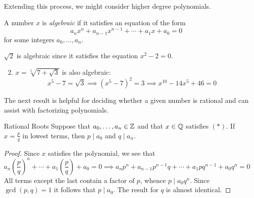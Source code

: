 % 


Extending this process, we might consider higher degree polynomials.

\begin{defn}{}{}
	A number $x$ is \emph{algebraic} if it satisfies an equation of the form\footnotemark
	\[a_nx^n+a_{n-1}x^{n-1}+\cdots+a_1x+a_0=0\tag*{$(\ast)$}\]
	for some integers $a_0,\ldots,a_n$.
\end{defn}


\begin{examples}{}{}
	\exstart $\sqrt 2$ is algebraic since it satisfies the equation $x^2-2=0$.

	\begin{enumerate}\setcounter{enumi}{1}
	  \item $x=\sqrt[5]{7+\sqrt 3}$ is also algebraic:
	  \[x^5-7=\sqrt 3\implies (x^5-7)^2=3\implies x^{10}-14x^5+46=0\]
	\end{enumerate}
\end{examples}


The next result is helpful for deciding whether a given number is rational and can assist with factorizing polynomials.

\begin{thm}{Rational Roots}{}
	Suppose that $a_0,\ldots,a_n\in\mathbb{Z}$ and that $x\in\mathbb{Q}$ satisfies $(\ast)$. If $x=\frac pq$ in lowest terms, then $p\mid a_0$ and $q\mid a_n$.
\end{thm}

\begin{proof}
	Since $x$ satisfies the polynomial, we see that
	\[a_n\left(\frac pq\right)^n+\cdots+a_1\left(\frac pq\right)+a_0=0\implies a_np^n+a_{n-1}p^{n-1}q+\cdots+a_1pq^{n-1}+a_0q^n=0\]
	All terms except the last contain a factor of $p$, whence $p\mid a_0q^n$. Since $\gcd(p,q)=1$ it follows that $p\mid a_0$. The result for $q$ is almost identical.
\end{proof}

